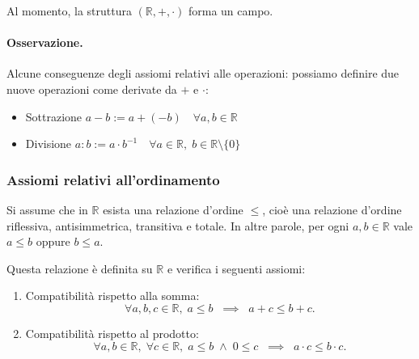 Al momento, la struttura $(\mathbb{R}, +, \cdot)$ forma un campo.

\paragraph{Osservazione.}
Alcune conseguenze degli assiomi relativi alle operazioni:
possiamo definire due nuove operazioni come derivate da $+$ e $\cdot$:

\begin{itemize}
\item Sottrazione \quad $a - b := a + (-b) \quad \forall a, b \in \mathbb{R}$
\item Divisione \quad $a : b := a \cdot b^{-1} \quad \forall a \in \mathbb{R}, \; b \in \mathbb{R}\setminus \{0\}$
\end{itemize}



\subsubsection{Assiomi relativi all'ordinamento}
Si assume che in $\mathbb{R}$ esista una relazione d'ordine $\leq$, cioè una relazione d'ordine riflessiva, antisimmetrica, transitiva e totale.
In altre parole, per ogni $a,b \in \mathbb{R}$ vale $a \leq b$ oppure $b \leq a$.

Questa relazione è definita su $\mathbb{R}$ e verifica i seguenti assiomi:

\begin{enumerate}
  \renewcommand{\labelenumi}{b\theenumi}

  \item Compatibilità rispetto alla somma:
  \[
    \forall a,b,c \in \mathbb{R}, \; a \leq b \;\;\implies\;\; a+c \leq b+c.
  \]

  \item Compatibilità rispetto al prodotto:
  \[
    \forall a,b \in \mathbb{R}, \; \forall c \in \mathbb{R}, \;
    a \leq b \;\wedge\; 0 \leq c \;\;\implies\;\; a \cdot c \leq b \cdot c.
  \]
\end{enumerate}

